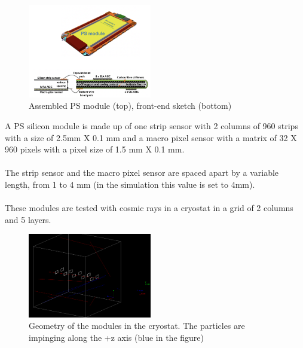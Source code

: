 \documentclass[10pt, a4paper, twocolumn]{article} %
\begin{document}
\begin{figure}[h!]
    \centering
    \includegraphics[width=0.48\textwidth]{img/ps_module.png}
    \caption{Assembled PS module (top), front-end sketch (bottom)}
    \label{fig:PS}
\end{figure}
A PS silicon module is made up of one strip sensor with 2 columns of 960 strips with a size of 2.5mm X 0.1 mm and a macro pixel sensor with a matrix of 32 X 960 pixels with a pixel size of 1.5 mm X 0.1 mm. \cite{PS}
\\
\\
The strip sensor and the macro pixel sensor are spaced apart by a variable length, from 1 to 4 mm (in the simulation this value is set to 4mm).  
\\
\\
These modules are tested with cosmic rays in a cryostat in a grid of 2 columns and 5 layers.
\begin{figure}[h!]
    \centering
    \includegraphics[width=0.48\textwidth]{img/detector.png}
    \caption{Geometry of the modules in the cryostat. The particles are impinging along the +z axis (blue in the figure)}
    \label{fig:Detector}
\end{figure}
\end{document}
